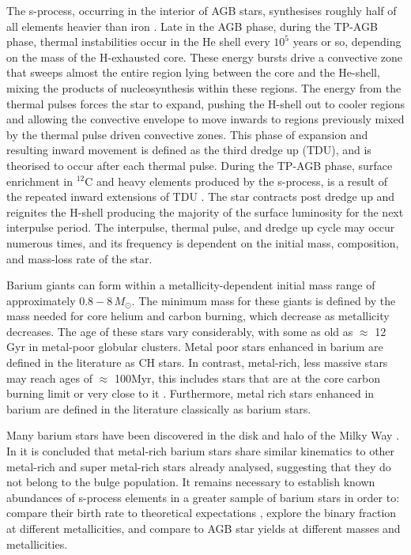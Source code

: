 \documentclass[a4paper,fleqn,usenatbib]{mnras}
\begin{document}
The s-process, occurring in the interior of AGB stars, synthesises roughly half of all elements heavier than iron \citep[e.g.,][]{busso1999,travaglio2001,herwig2005,bisterzo2014,karakas2014}. Late in the AGB phase, during the TP-AGB phase, thermal instabilities occur in the He shell every $10^5$ years or so, depending on the mass of the H-exhausted core. These energy bursts drive a convective zone that sweeps almost the entire region lying between the core and the He-shell, mixing the products of nucleosynthesis within these regions. The energy from the thermal pulses forces the star to expand, pushing the H-shell out to cooler regions and allowing the convective envelope to move inwards to regions previously mixed by the thermal pulse driven convective zones. This phase of expansion and resulting inward movement is defined as the third dredge up (TDU), and is theorised to occur after each thermal pulse. During the TP-AGB phase, surface enrichment in $^{12}$C and heavy elements produced by the s-process, is a result of the repeated inward extensions of TDU \citep[e.g.,][]{busso2001}. The star contracts post dredge up and reignites the H-shell producing the majority of the surface luminosity for the next interpulse period. The interpulse, thermal pulse, and dredge up cycle may occur numerous times, and its frequency is dependent on the initial mass, composition, and mass-loss rate of the star.

Barium giants can form within a metallicity-dependent initial mass range of approximately $0.8 - 8\,M_{\odot}$. The minimum mass for these giants is defined by the mass needed for core helium and carbon burning, which decrease as metallicity decreases. The age of these stars vary considerably, with some as old as $\approx$ 12\,Gyr in metal-poor globular clusters. Metal poor stars enhanced in barium are defined in the literature as CH stars. In contrast, metal-rich, less massive stars may reach ages of $\approx$ 100Myr, this includes stars that are at the core carbon burning limit or very close to it \citep[e.g.,][]{whitelock2013}. Furthermore, metal rich stars enhanced in barium are defined in the literature classically as barium stars.

Many barium stars have been discovered in the disk and halo of the Milky Way \citep{jorissen1993,gomez1997,mennessier1997}. In \citet{pereira2011} it is concluded that metal-rich barium stars share similar kinematics to other metal-rich and super metal-rich stars already analysed, suggesting that they do not belong to the bulge population. It remains necessary to establish known abundances of s-process elements in a greater sample of barium stars in order to: compare their birth rate to theoretical expectations \citep{han1995}, explore the binary fraction at different metallicities, and compare to AGB star yields at different masses and metallicities.
\end{document}
